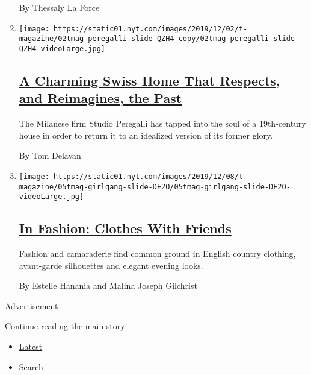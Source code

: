 \begin{enumerate}
  By Thessaly La Force
\item
  \texttt{[image: https://static01.nyt.com/images/2019/12/02/t-magazine/02tmag-peregalli-slide-QZH4-copy/02tmag-peregalli-slide-QZH4-videoLarge.jpg]}

  \hypertarget{a-charming-swiss-home-that-respects-and-reimagines-the-past}{%
  \subsection{\texorpdfstring{\href{/2019/12/02/t-magazine/swiss-home-studio-peregalli.html}{A
  Charming Swiss Home That Respects, and Reimagines, the
  Past}}{A Charming Swiss Home That Respects, and Reimagines, the Past}}\label{a-charming-swiss-home-that-respects-and-reimagines-the-past}}

  The Milanese firm Studio Peregalli has tapped into the soul of a
  19th-century house in order to return it to an idealized version of
  its former glory.

  By Tom Delavan
\item
  \texttt{[image: https://static01.nyt.com/images/2019/12/08/t-magazine/05tmag-girlgang-slide-DE2O/05tmag-girlgang-slide-DE2O-videoLarge.jpg]}

  \hypertarget{in-fashion-clothes-with-friends}{%
  \subsection{\texorpdfstring{\href{/2019/12/02/t-magazine/clothes-with-friends.html}{In
  Fashion: Clothes With
  Friends}}{In Fashion: Clothes With Friends}}\label{in-fashion-clothes-with-friends}}

  Fashion and camaraderie find common ground in English country
  clothing, avant-garde silhouettes and elegant evening looks.

  By Estelle Hanania and Malina Joseph Gilchrist
\end{enumerate}

Advertisement

\protect\hyperlink{after-mid1}{Continue reading the main story}

\begin{itemize}
\tightlist
\item
  \protect\hyperlink{stream-panel}{Latest}
\item
  Search
\end{itemize}

